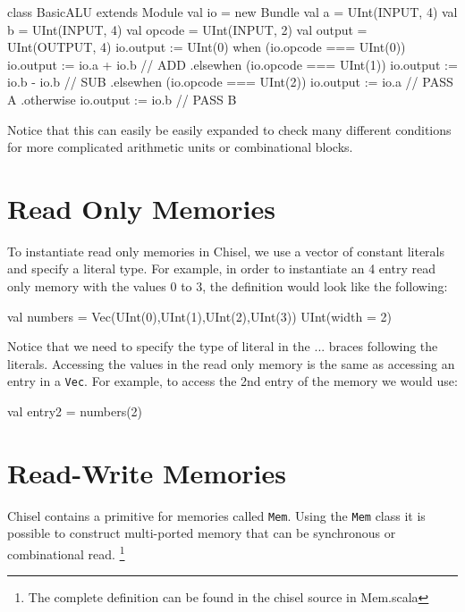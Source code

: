 \begin{scala}
class BasicALU extends Module {
  val io = new Bundle {
    val a      = UInt(INPUT, 4)
    val b      = UInt(INPUT, 4)
    val opcode = UInt(INPUT, 2)
    val output = UInt(OUTPUT, 4)
  }
  io.output := UInt(0) 
  when (io.opcode === UInt(0)) {
    io.output := io.a + io.b   // ADD
  } .elsewhen (io.opcode === UInt(1)) {
    io.output := io.b - io.b   // SUB
  } .elsewhen (io.opcode === UInt(2)) {
    io.output := io.a  	       // PASS A
  } .otherwise {
    io.output := io.b          // PASS B
  }
}
\end{scala}

Notice that this can easily be easily expanded to check many different conditions for more complicated arithmetic units or combinational blocks.

\section{Read Only Memories}

To instantiate read only memories in Chisel, we use a vector of constant literals and specify a literal type. For example, in order to instantiate an 4 entry read only memory with the values 0 to 3, the definition would look like the following:

\begin{footnotesize}
\begin{scala}
val numbers = 
  Vec(UInt(0),UInt(1),UInt(2),UInt(3)){ UInt(width = 2) }
\end{scala}
\end{footnotesize}

Notice that we need to specify the type of literal in the {...} braces following the literals. Accessing the values in the read only memory is the same as accessing an entry in a \verb+Vec+. For example, to access the 2nd entry of the memory we would use:

\begin{scala}
val entry2 = numbers(2)
\end{scala}

\section{Read-Write Memories}

Chisel contains a primitive for memories called \verb+Mem+. Using the \verb+Mem+ class it is possible to construct multi-ported memory that can be synchronous or combinational read. \footnote{The complete definition can be found in the chisel source in  Mem.scala}

